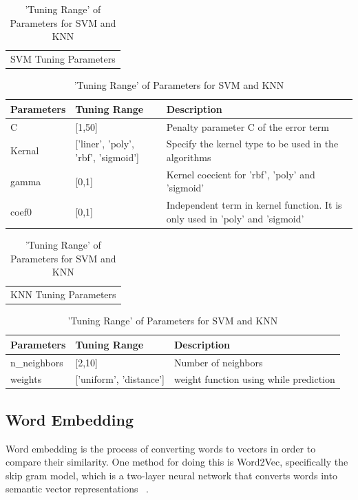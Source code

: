 \documentclass[sigconf]{acmart}
\theoremstyle{break}
\begin{document}
    \begin{table}[h!]
        \centering
        \begin{tabular}{c}
            SVM Tuning Parameters  \\
        \end{tabular}
        \begin{tabular}{p{1.5cm}|p{2cm}|p{4cm}}
            \textbf{Parameters} & \textbf{Tuning Range } & \textbf{Description} \\
            \hline
            C & [1,50] & Penalty parameter C of the error term \\
            \hline
            Kernal & ['liner', 'poly', 'rbf', 'sigmoid'] & Specify the kernel type to be used in the algorithms \\
            \hline
            gamma & [0,1] & Kernel coecient for 'rbf', 'poly' and 'sigmoid' \\
            \hline
            coef0 & [0,1] & Independent term in kernel function. It is only used in 'poly' and 'sigmoid' \\
            \hline
        \end{tabular} 
        \begin{tabular}{c}
            KNN Tuning Parameters  \\
        \end{tabular}
        \begin{tabular}{p{1.5cm}|p{2cm}|p{4cm}}
            \textbf{Parameters} & \textbf{Tuning Range } & \textbf{Description} \\
            \hline
            n\_neighbors & [2,10] & Number of neighbors \\
            \hline
            weights & ['uniform', 'distance'] & weight function using while prediction \\
            \hline
        \end{tabular}    
        \caption{'Tuning Range' of Parameters for SVM and KNN}
        \label{tab:DE_Parameters}
    \end{table}
    
    \subsection{Word Embedding}
    \label{sssec:Word Embedding}
    Word embedding is the process of converting words to vectors in order to compare their similarity. One method for doing this is Word2Vec, specifically the skip gram model, which is a two-layer neural network that converts words into semantic vector representations ~\cite{mikolov2013distributed}.
    
\end{document}
